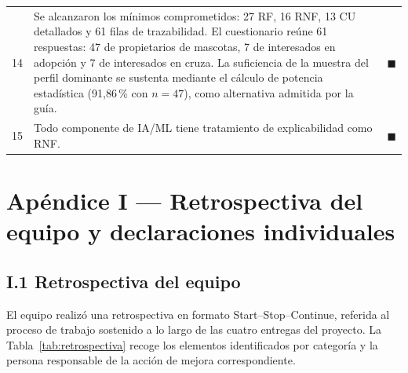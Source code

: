 \documentclass[journal,onecolumn]{IEEEtran}
\begin{document}
\begin{table}[H]
\begin{tabularx}{\textwidth}{@{}c X c@{}}
			14 & Se alcanzaron los mínimos comprometidos: 27 RF, 16 RNF, 13 CU detallados y 61 filas de trazabilidad. El cuestionario reúne 61 respuestas: 47 de propietarios de mascotas, 7 de interesados en adopción y 7 de interesados en cruza. La suficiencia de la muestra del perfil dominante se sustenta mediante el cálculo de potencia estadística (91,86\,\% con $n=47$), como alternativa admitida por la guía. & $\blacksquare$ \\
			15 & Todo componente de IA/ML tiene tratamiento de explicabilidad como RNF. & $\blacksquare$ \\
			\bottomrule
		\end{tabularx}
	\end{table}
	
	
\section*{Apéndice I --- Retrospectiva del equipo y declaraciones individuales}
\label{ap:retrospectiva}

\subsection*{I.1 Retrospectiva del equipo}
\label{sec:retrospectiva}

El equipo realizó una retrospectiva en formato Start--Stop--Continue,
referida al proceso de trabajo sostenido a lo largo de las cuatro entregas
del proyecto. La Tabla~\ref{tab:retrospectiva} recoge los elementos
identificados por categoría y la persona responsable de la acción de
mejora correspondiente.
\end{document}

